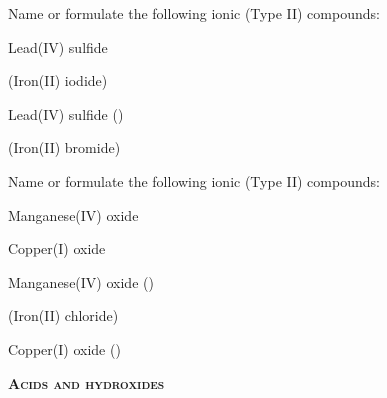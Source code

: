 \documentclass[main.tex]{subfiles}
\begin{document}
\begin{multicols*}{2}
\begin{question}[ID=\the\value{numA}]
Name or formulate the following ionic (Type II) compounds:
\begin{inparaenum}[(a)]
\item {}			%
\item Lead(IV) sulfide	%
\item {}		%
\end{inparaenum}
\end{question}
\begin{solution}
\begin{inparaenum}[(a)]
\item {}			(Iron(II) iodide)
\item Lead(IV) sulfide	()
\item {}		(Iron(II) bromide)	
 \end{inparaenum}\hspace{0.1cm}\end{solution}
\begin{question}[ID=\the\value{numA}]
Name or formulate the following ionic (Type II) compounds:
\begin{inparaenum}[(a)]
\item Manganese(IV) oxide	%
\item {}			%
\item Copper(I) oxide%
\end{inparaenum}
\end{question}
\begin{solution}
\begin{inparaenum}[(a)]
\item Manganese(IV) oxide	()
\item {}			(Iron(II) chloride)	
\item Copper(I) oxide ()
 \end{inparaenum}\hspace{0.1cm}\end{solution}

{\raggedright\textsc{\textbf{Acids and hydroxides}}\par}



\end{multicols*}
\end{document}
